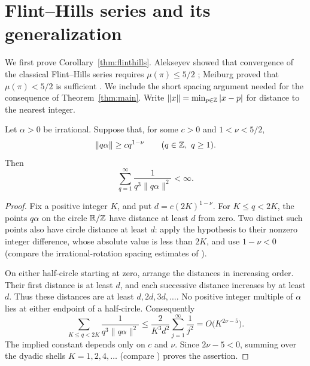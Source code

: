 \section{Flint--Hills series and its generalization}\label{sec:series}

We first prove Corollary~\ref{thm:flinthills}. Alekseyev showed
that convergence of the classical Flint--Hills series requires
\(\mu(\pi)\le5/2\) \cite[Corollary~4]{alekseyev}; Meiburg proved
that \(\mu(\pi)<5/2\) is sufficient \cite[Theorem~2.5]{meiburg}.
We include the short spacing argument needed for the consequence of
Theorem~\ref{thm:main}. Write
\(\|x\|=\min_{p\in\mathbb Z}|x-p|\) for distance to the nearest integer.

\begin{lemma}\label{series:dyadic}
Let \(\alpha>0\) be irrational. Suppose that, for some \(c>0\) and
\(1<\nu<5/2\),
\[
 \|q\alpha\|\ge c q^{1-\nu}\qquad(q\in\ZZ,\ q\ge1).
\]
Then
\[
 \sum_{q=1}^{\infty}\frac{1}{q^3\|q\alpha\|^2}<\infty.
\]
\end{lemma}

\begin{proof}
Fix a positive integer \(K\), and put
\(d=c(2K)^{1-\nu}\). For \(K\le q<2K\), the points
\(q\alpha\) on the circle \(\mathbb R/\mathbb Z\) have distance at least
\(d\) from zero. Two distinct such points also have circle distance
at least \(d\): apply the hypothesis to their nonzero integer
difference, whose absolute value is less than \(2K\), and use
\(1-\nu<0\) (compare the irrational-rotation spacing estimates of \cite{hardylittlewood1923}).

On either half-circle starting at zero, arrange the distances in
increasing order. Their first distance is at least \(d\), and each
successive distance increases by at least \(d\). Thus these distances
are at least \(d,2d,3d,\ldots\). No positive integer multiple of
\(\alpha\) lies at either endpoint of a half-circle. Consequently
\[
 \sum_{K\le q<2K}\frac{1}{q^3\|q\alpha\|^2}
 \le \frac{2}{K^3d^2}\sum_{j=1}^{\infty}\frac{1}{j^2}
 =O\bigl(K^{2\nu-5}\bigr).
\]
The implied constant depends only on \(c\) and \(\nu\).
Since \(2\nu-5<0\), summing over the dyadic shells \(K=1,2,4,\ldots\) (compare \cite{abel1826}) proves
the assertion.
\end{proof}

